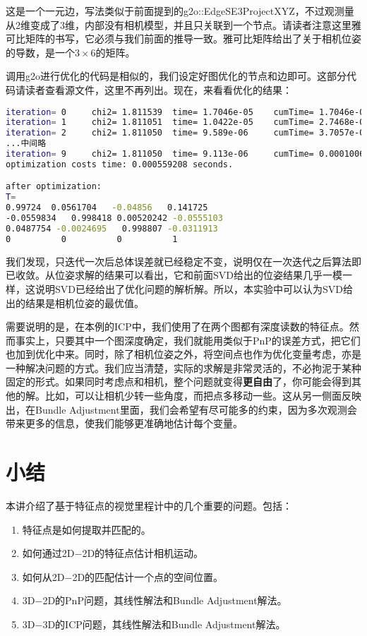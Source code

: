 这是一个一元边，写法类似于前面提到的g2o::EdgeSE3ProjectXYZ，不过观测量从2维变成了3维，内部没有相机模型，并且只关联到一个节点。请读者注意这里雅可比矩阵的书写，它必须与我们前面的推导一致。雅可比矩阵给出了关于相机位姿的导数，是一个$3 \times 6$的矩阵。

调用g2o进行优化的代码是相似的，我们设定好图优化的节点和边即可。这部分代码请读者查看源文件，这里不再列出。现在，来看看优化的结果：

\begin{lstlisting}[language=sh, caption=终端输出：]
iteration= 0	 chi2= 1.811539	 time= 1.7046e-05	 cumTime= 1.7046e-05	 edges= 74	 schur= 0
iteration= 1	 chi2= 1.811051	 time= 1.0422e-05	 cumTime= 2.7468e-05	 edges= 74	 schur= 0
iteration= 2	 chi2= 1.811050	 time= 9.589e-06	 cumTime= 3.7057e-05	 edges= 74	 schur= 0
...中间略
iteration= 9	 chi2= 1.811050	 time= 9.113e-06	 cumTime= 0.000100604	 edges= 74	 schur= 0
optimization costs time: 0.000559208 seconds.

after optimization:
T=
0.99724  0.0561704   -0.04856   0.141725
-0.0559834   0.998418 0.00520242 -0.0555103
0.0487754 -0.0024695   0.998807 -0.0311913
0          0          0          1
\end{lstlisting}

我们发现，只迭代一次后总体误差就已经稳定不变，说明仅在一次迭代之后算法即已收敛。从位姿求解的结果可以看出，它和前面SVD给出的位姿结果几乎一模一样，这说明SVD已经给出了优化问题的解析解。所以，本实验中可以认为SVD给出的结果是相机位姿的最优值。

需要说明的是，在本例的ICP中，我们使用了在两个图都有深度读数的特征点。然而事实上，只要其中一个图深度确定，我们就能用类似于PnP的误差方式，把它们也加到优化中来。同时，除了相机位姿之外，将空间点也作为优化变量考虑，亦是一种解决问题的方式。我们应当清楚，实际的求解是非常灵活的，不必拘泥于某种固定的形式。如果同时考虑点和相机，整个问题就变得\textbf{更自由}了，你可能会得到其他的解。比如，可以让相机少转一些角度，而把点多移动一些。这从另一侧面反映出，在Bundle Adjustment里面，我们会希望有尽可能多的约束，因为多次观测会带来更多的信息，使我们能够更准确地估计每个变量。

\section{小结}
本讲介绍了基于特征点的视觉里程计中的几个重要的问题。包括：

\begin{enumerate}
	\item 特征点是如何提取并匹配的。
	\item 如何通过2D−2D的特征点估计相机运动。
	\item 如何从2D−2D的匹配估计一个点的空间位置。
	\item 3D−2D的PnP问题，其线性解法和Bundle Adjustment解法。
	\item 3D−3D的ICP问题，其线性解法和Bundle Adjustment解法。
\end{enumerate}

